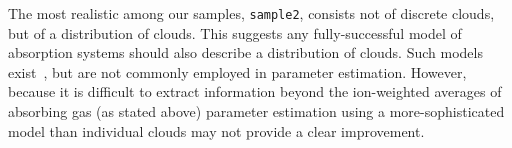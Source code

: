 \documentclass[fleqn,usenatbib]{mnras}
\newcommand{\NHI}{N_{\ion{H}{I}}}
\begin{document}
The most realistic among our samples, \texttt{sample2}, consists not of discrete clouds, but of a distribution of clouds.
This suggests any fully-successful model of absorption systems should also describe a distribution of clouds.
Such models exist~\citep[e.g.][]{stern2016Universal}, but are not commonly employed in parameter estimation.
However, because it is difficult to extract information beyond the ion-weighted averages of absorbing gas (as stated above) parameter estimation using a more-sophisticated model than individual clouds may not provide a clear improvement.

\end{document}
